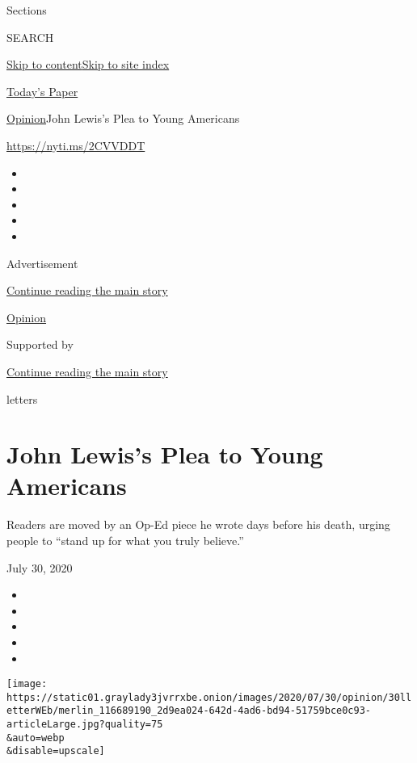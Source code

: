 Sections

SEARCH

\protect\hyperlink{site-content}{Skip to
content}\protect\hyperlink{site-index}{Skip to site index}

\href{https://myaccount.nytimes3xbfgragh.onion/auth/login?response_type=cookie\&client_id=vi}{}

\href{https://www.nytimes3xbfgragh.onion/section/todayspaper}{Today's
Paper}

\href{/section/opinion}{Opinion}\textbar{}John Lewis's Plea to Young
Americans

\url{https://nyti.ms/2CVVDDT}

\begin{itemize}
\item
\item
\item
\item
\item
\end{itemize}

Advertisement

\protect\hyperlink{after-top}{Continue reading the main story}

\href{/section/opinion}{Opinion}

Supported by

\protect\hyperlink{after-sponsor}{Continue reading the main story}

letters

\hypertarget{john-lewiss-plea-to-young-americans}{%
\section{John Lewis's Plea to Young
Americans}\label{john-lewiss-plea-to-young-americans}}

Readers are moved by an Op-Ed piece he wrote days before his death,
urging people to ``stand up for what you truly believe.''

July 30, 2020

\begin{itemize}
\item
\item
\item
\item
\item
\end{itemize}

\texttt{[image: https://static01.graylady3jvrrxbe.onion/images/2020/07/30/opinion/30lletterWEb/merlin\_116689190\_2d9ea024-642d-4ad6-bd94-51759bce0c93-articleLarge.jpg?quality=75\\\&auto=webp\\\&disable=upscale]}

